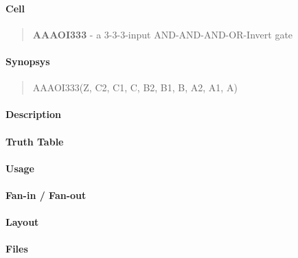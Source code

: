 \label{AAAOI333}
\paragraph{Cell}
\begin{quote}
    \textbf{AAAOI333} - a 3-3-3-input AND-AND-AND-OR-Invert gate
\end{quote}

\paragraph{Synopsys}
\begin{quote}
    AAAOI333(Z, C2, C1, C, B2, B1, B, A2, A1, A)
\end{quote}

\paragraph{Description}



\paragraph{Truth Table}


\paragraph{Usage}

\paragraph{Fan-in / Fan-out}

\paragraph{Layout}

\paragraph{Files}
